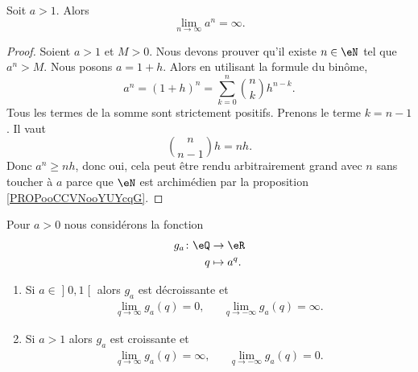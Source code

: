 \begin{proposition}\label{PROPooVXKBooQPPjMn}
	Soit \( a>1\). Alors
	\begin{equation}
		\lim_{n\to \infty} a^n=\infty.
	\end{equation}
\end{proposition}

\begin{proof}
	Soient \( a>1\) et  \( M>0\). Nous devons prouver qu'il existe \( n\in \eN\) tel que \( a^n>M\). Nous posons \( a=1+h\). Alors en utilisant la formule du binôme,
	\begin{equation}
		a^n=(1+h)^n=\sum_{k=0}^n{n\choose k}h^{n-k}.
	\end{equation}
	Tous les termes de la somme sont strictement positifs. Prenons le terme \( k=n-1\). Il vaut
	\begin{equation}
		{n\choose n-1}h=nh.
	\end{equation}
	Donc \( a^n\geq nh\), donc oui, cela peut être rendu arbitrairement grand avec \( n\) sans toucher à \( a\) parce que \( \eN\) est archimédien par la proposition \ref{PROPooCCVNooYUYcqG}.
\end{proof}

\begin{proposition}      \label{PROPooGCBZooTcyGtO}
	Pour \( a>0\) nous considérons la fonction
	\begin{equation}
		\begin{aligned}
			g_a\colon \eQ & \to \eR      \\
			q             & \mapsto a^q.
		\end{aligned}
	\end{equation}
	\begin{enumerate}
		\item
		      Si \( a\in \mathopen] 0 , 1 \mathclose[\) alors \( g_a\) est décroissante et
		      \begin{subequations}
			      \begin{align}
				      \lim_{q\to \infty} g_a(q)=0, &  & \lim_{q\to -\infty} g_a(q)=\infty.
			      \end{align}
		      \end{subequations}
		\item      \label{ITEMooGOEVooKVoVpZ}
		      Si \( a>1\)  alors \( g_a\) est croissante et
		      \begin{subequations}
			      \begin{align}
				      \lim_{q\to \infty} g_a(q)=\infty, &  & \lim_{q\to -\infty} g_a(q)=0.
			      \end{align}
		      \end{subequations}
	\end{enumerate}
\end{proposition}

